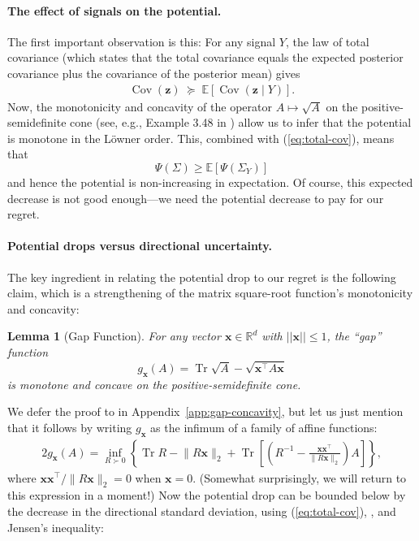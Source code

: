 \documentclass[11pt]{article}
\newtheorem{lemma}[theorem]{Lemma}
\newcommand{\E}[1]{\mathbb E\left[#1\right]}
\newcommand{\Rbb}{\mathbb R}
\DeclareMathOperator{\Cov}{Cov}
\DeclareMathOperator{\Tr}{Tr}
\newcommand{\norm}[1]{\lVert #1\rVert_2}
\newcommand{\bx}{\boldsymbol x}
\newcommand{\bz}{\boldsymbol z}
\begin{document}
\paragraph{The effect of signals on the potential.}
The first important observation is this: For any signal $Y$, the law
of total covariance ({which states that} the total covariance equals the expected posterior covariance plus the covariance of the posterior mean) gives
\begin{gather}
  \Cov(\bz) \;\succeq\;\E{\Cov(\bz\mid Y)}. \label{eq:total-cov}
\end{gather}
Now, the monotonicity and concavity of the operator $A \mapsto \sqrt{A}$ on the positive-semidefinite cone (see, e.g., Example 3.48 in \cite{vandenberghe2004convex}) allow us to infer that the potential is
monotone in the L\"owner order. This, combined with
(\ref{eq:total-cov}){, means that} 
\begin{equation}\label{eq:potential-drops}
    \Psi(\Sigma) \geq \E{\Psi(\Sigma_Y)}
\end{equation}
and hence the potential is non-increasing in expectation. Of course, this
expected decrease is not good enough---{we need the
potential decrease to pay for our regret}.

\paragraph{Potential drops versus directional uncertainty.}
The {key ingredient in relating} the potential drop to our regret is
the following claim, which is a strengthening of the matrix
square-root function's {monotonicity and concavity}: 

\begin{lemma}[Gap Function]
  \label{lem:g-mono-concave}
  For any vector
  $\bx\in \Rbb^d$ with $||\bx||\leq 1$, the ``gap'' function
  \[ g_{\bx}(A) = \Tr\sqrt A - \sqrt{\bx^\top A \bx}
  \] is monotone
  and concave on the positive-semidefinite cone.
\end{lemma}

We defer the proof to
 in Appendix~\ref{app:gap-concavity}, but let us just
mention that it follows by writing $g_{\bx}$ as the infimum of a
family of affine functions{:}
\begin{gather}
  2g_{\bx}(A)=\inf_{R\succ0}\left\{
    \Tr R-\norm{R\bx}
    +\Tr\!\left[\left(R^{-1}-\frac{\bx\bx^\top}{\norm{R\bx}}\right)A\right]\right\}, \label{eq:affine}
\end{gather}
where $\bx\bx^\top/\norm{R\bx} = 0$ when $\bx = 0$. (Somewhat
surprisingly, we will return to this expression in a moment!)
Now the potential drop can be {bounded below by the decrease in} the directional standard deviation, using (\ref{eq:total-cov}), , and Jensen's inequality: 
\end{document}
